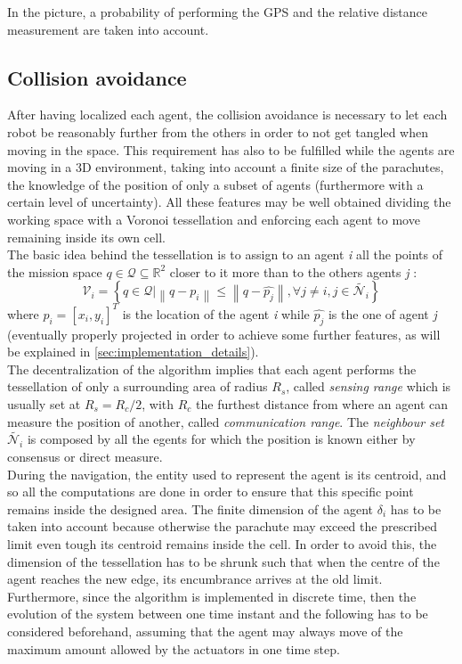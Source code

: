 In the picture, a probability of performing the GPS and the relative distance measurement are taken into account.

\subsection{Collision avoidance}
After having localized each agent, the collision avoidance is necessary to let each robot be reasonably further from the others in order to not get tangled when moving in the space. This requirement has also to be fulfilled while the agents are moving in a 3D environment, taking into account a finite size of the parachutes, the knowledge of the position of only a subset of agents (furthermore with a certain level of uncertainty). All these features may be well obtained dividing the working space with a Voronoi tessellation and enforcing each agent to move remaining inside its own cell. \\
The basic idea behind the tessellation is to assign to an agent \textit{i} all the points of the mission space $q \in \mathcal{Q} \subseteq \mathbb{R}^2$ closer to it more than to the others agents \textit{j} \cite{b1}:
\begin{equation}
    \mathcal{V}_i = \left\{ q \in \mathcal{Q} \lvert \left\lVert q-p_i \right\rVert \leq \left\lVert q-\hat{p_j} \right\rVert, \forall j \neq i, j \in \tilde{\mathcal{N}_{i}} \right\}
\end{equation}
where $p_i=\left[x_i, y_i\right]^T$ is the location of the agent \textit{i} while $\hat{p_j}$ is the one of agent \textit{j} (eventually properly projected in order to achieve some further features, as will be explained in \autoref{sec:implementation_details}).\\
The decentralization of the algorithm implies that each agent performs the tessellation of only a surrounding area of radius $R_s$, called \textit{sensing range} which is usually set at $R_s = R_c/2$, with $R_c$ the furthest distance from where an agent can measure the position of another, called \textit{communication range}. The \textit{neighbour set} $\tilde{\mathcal{N}_{i}}$ is composed by all the egents for which the position is known either by consensus or direct measure. \\
During the navigation, the entity used to represent the agent is its centroid, and so all the computations are done in order to ensure that this specific point remains inside the designed area. The finite dimension of the agent $\delta_i$ has to be taken into account because otherwise the parachute may exceed the prescribed limit even tough its centroid remains inside the cell. In order to avoid this, the dimension of the tessellation has to be shrunk such that when the centre of the agent reaches the new edge, its encumbrance arrives at the old limit. Furthermore, since the algorithm is implemented in discrete time, then the evolution of the system between one time instant and the following has to be considered beforehand, assuming that the agent may always move of the maximum amount allowed by the actuators in one time step.\\

